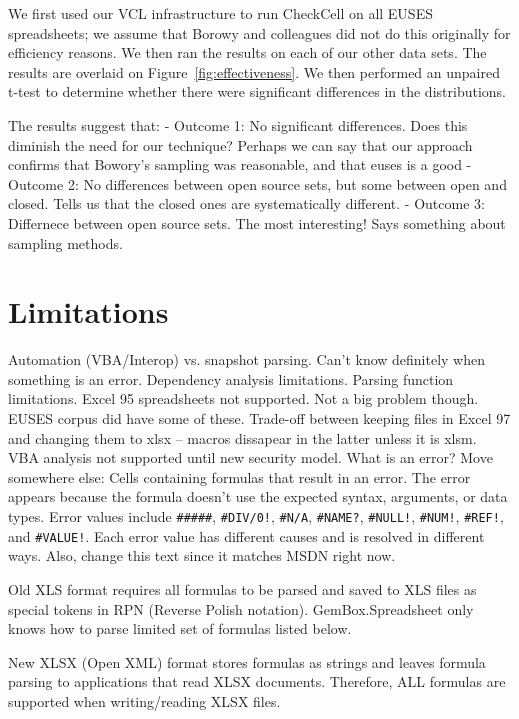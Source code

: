 \documentclass[conference]{IEEEtran}
\begin{document}
We first used our VCL infrastructure to run CheckCell on all EUSES spreadsheets; we assume
that Borowy and colleagues did not do this originally for efficiency reasons.
We then ran the results on each of our other data sets.
The results are overlaid on Figure~\ref{fig:effectiveness}.
We then performed an unpaired t-test to determine whether there were significant differences
in the distributions.

The results suggest that:
- Outcome 1: No significant differences. Does this diminish the need for our technique?
  Perhaps we can say that our approach confirms that Bowory's sampling was reasonable,
  and that euses is a good 
- Outcome 2: No differences between open source sets, but some between open and closed. 
  Tells us that the closed ones are systematically different.
- Outcome 3: Differnece between open source sets. The most interesting! Says something about 
  sampling methods.


\section{Limitations}

Automation (VBA/Interop) vs. snapshot parsing. Can't know definitely when
something is an error.
%
Dependency analysis limitations.
%
Parsing function limitations.
%
Excel 95 spreadsheets not supported. Not a big problem though. EUSES corpus did have some of these. Trade-off between keeping files in Excel 97 and changing them to xlsx -- macros dissapear in the latter unless it is xlsm.
%
VBA analysis not supported until new security model.
%
What is an error? Move somewhere else: Cells containing formulas that result in an error. The error appears because the formula doesn't use the expected syntax, arguments, or data types. Error values include \texttt{\#\#\#\#\#}, \texttt{\#DIV/0!}, \texttt{\#N/A}, \texttt{\#NAME?}, \texttt{\#NULL!}, \texttt{\#NUM!}, \texttt{\#REF!}, and \texttt{\#VALUE!}. Each error value has different causes and is resolved in different ways. Also, change this text since it matches MSDN right now.

Old XLS format requires all formulas to be parsed and saved to XLS files as special tokens in RPN (Reverse Polish notation). GemBox.Spreadsheet only knows how to parse limited set of formulas listed below.

New XLSX (Open XML) format stores formulas as strings and leaves formula parsing to applications that read XLSX documents. Therefore, ALL formulas are supported when writing/reading XLSX files.
\end{document}
